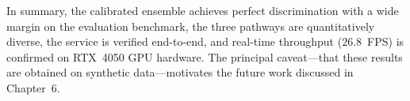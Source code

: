In summary, the calibrated ensemble achieves perfect discrimination with a wide margin on the evaluation benchmark, the three pathways are quantitatively diverse, the service is verified end-to-end, and real-time throughput ($26.8$~FPS) is confirmed on RTX~4050 GPU hardware. The principal caveat---that these results are obtained on synthetic data---motivates the future work discussed in Chapter~6.
